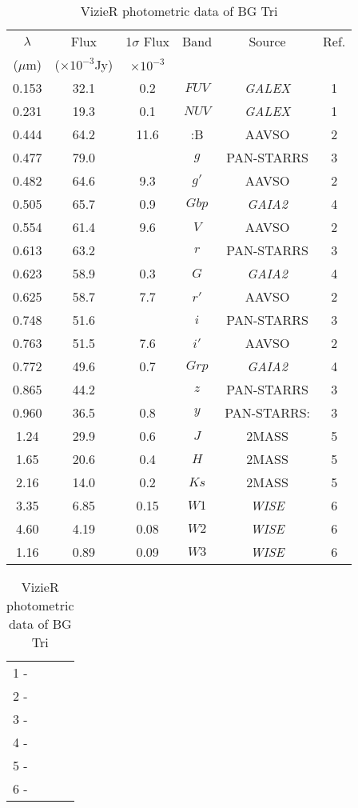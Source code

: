 \documentclass[fleqn,usenatbib]{mnras}
\begin{document}
\begin{table}


\caption{VizieR photometric data of BG Tri}
\label{tab:SEDlog}
\begin{tabular}{cccccc}
  \hline \hline
$\lambda$  & Flux & 1$\sigma$ Flux & Band & Source & Ref. \\
($\mu$m)  & ($\times 10^{-3}$Jy)  & $\times 10^{-3}$   &    &  &   \\ \hline
0.153 & 32.1 &0.2  & $FUV$ & \textit{GALEX} & 1 \\
0.231 & 19.3 &0.1  & $NUV$ & \textit{GALEX} & 1\\
0.444 & 64.2 &	11.6	& :B & AAVSO  & 2 \\
0.477 & 79.0 & 	    & $g$  & PAN-STARRS & 3 \\
0.482 & 64.6 &	9.3 &	$g'$ & AAVSO & 2 \\
0.505 & 65.7 & 0.9 & $Gbp$ & \textit{GAIA2} & 4 \\
0.554 & 61.4  & 9.6 & $V$ &	AAVSO & 2 \\
0.613 & 63.2 & 	   & $r$ & PAN-STARRS & 3 \\
0.623 & 58.9 & 0.3 & $G$ & \textit{GAIA2} & 4 \\
0.625 & 58.7 &	7.7& $r'$ &	AAVSO & 2 \\
0.748 & 51.6 & 	   & $i$ & PAN-STARRS & 3 \\
0.763 & 51.5 &	7.6 &	$i'$ & AAVSO & 2 \\
0.772 & 49.6 & 0.7 & $Grp$  & \textit{GAIA2} & 4 \\
0.865 & 44.2 & 	   & $z$ & PAN-STARRS & 3 \\
0.960 & 36.5 & 0.8& $y$ & PAN-STARRS: & 3 \\
1.24 & 29.9 &0.6 & $J$ & 2MASS & 5\\
1.65 & 20.6 &0.4 & $H$ & 2MASS & 5\\
2.16 & 14.0 &0.2 & $Ks$ & 2MASS & 5 \\
3.35 & 6.85 &0.15 &$W1$ &  \textit{WISE} & 6\\
4.60 & 4.19 &0.08 & $W2$ &  \textit{WISE} & 6 \\
1.16 & 0.89 &0.09 & $W3$ &  \textit{WISE} & 6 \\
 \hline
\end{tabular}
\begin{tabular}{l}
1 - \citet{2017ApJS..230...24B} \\
2 - \citet{2015AAS...22533616H} \\
3 - \citet{2016arXiv161205560C} \\
4 - \citet{2018AA...616A...1G} \\
5 - \citet{2003yCat.2246....0C} \\
6 - \cite{2012yCat.2311....0C} \\
\end{tabular}
\end{table} 
    
\end{document}
